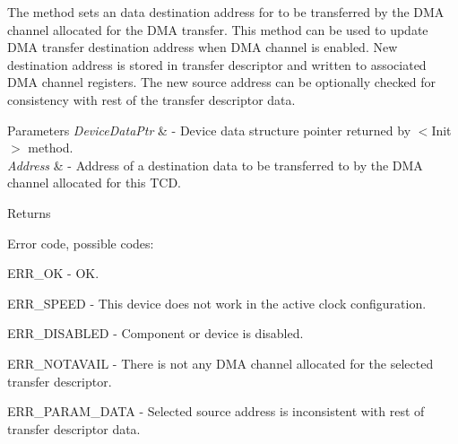 The method sets an data destination address for to be transferred by the D\-M\-A channel allocated for the D\-M\-A transfer. This method can be used to update D\-M\-A transfer destination address when D\-M\-A channel is enabled. New destination address is stored in transfer descriptor and written to associated D\-M\-A channel registers. The new source address can be optionally checked for consistency with rest of the transfer descriptor data. 


\begin{DoxyParams}{Parameters}
{\em Device\-Data\-Ptr} & -\/ Device data structure pointer returned by $<$\-Init$>$ method. \\
\hline
{\em Address} & -\/ Address of a destination data to be transferred to by the D\-M\-A channel allocated for this T\-C\-D. \\
\hline
\end{DoxyParams}
\begin{DoxyReturn}{Returns}

\begin{DoxyItemize}
\item Error code, possible codes\-:
\begin{DoxyItemize}
\item E\-R\-R\-\_\-\-O\-K -\/ O\-K.
\item E\-R\-R\-\_\-\-S\-P\-E\-E\-D -\/ This device does not work in the active clock configuration.
\item E\-R\-R\-\_\-\-D\-I\-S\-A\-B\-L\-E\-D -\/ Component or device is disabled.
\item E\-R\-R\-\_\-\-N\-O\-T\-A\-V\-A\-I\-L -\/ There is not any D\-M\-A channel allocated for the selected transfer descriptor.
\item E\-R\-R\-\_\-\-P\-A\-R\-A\-M\-\_\-\-D\-A\-T\-A -\/ Selected source address is inconsistent with rest of transfer descriptor data. 
\end{DoxyItemize}
\end{DoxyItemize}
\end{DoxyReturn}
